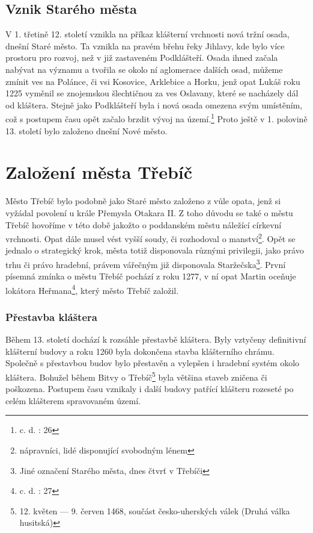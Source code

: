 \documentclass[a4paper,oneside,12p]{report}
\begin{document}
\subsection{Vznik Starého města}
V 1. třetině 12. století vznikla na příkaz klášterní vrchnosti nová tržní osada, dnešní Staré město.
Ta vznikla na pravém břehu řeky Jihlavy, kde bylo více prostoru pro rozvoj, než v již zastaveném Podklášteří.
Osada ihned začala nabývat na významu a tvořila se okolo ní aglomerace dalších osad, můžeme zmínit ves na Polánce, či vsi Kosovice, Arklebice a Horku, jenž opat Lukáš roku 1225 vyměnil se znojemskou šlechtičnou za ves Oslavany, které se nacházely dál od kláštera.
Stejně jako Podklášteří byla i nová osada omezena svým umístěním, což s postupem času opět začalo brzdit vývoj na území.\footnote{c. d. : 26}
Proto ještě v 1. polovině 13. století bylo založeno dnešní Nové město.


\section{Založení města Třebíč}
Město Třebíč bylo podobně jako Staré město založeno z vůle opata, jenž si vyžádal povolení u krále Přemysla Otakara II.
Z toho důvodu se také o městu Třebíč hovoříme v této době jakožto o poddanském městu náležící církevní vrchnosti.
Opat dále musel vést vyšší soudy, či rozhodoval o manství\footnote{nápravníci, lidé disponující svobodným lénem}.
Opět se jednalo o strategický krok, města totiž disponovala různými privilegii, jako právo trhu či právo hradební, právem vářečným již disponovala Staržečska\footnote{Jiné označení Starého města, dnes čtvrť v Třebíči}.
První písemná zmínka o městu Třebíč pochází z roku 1277, v ní opat Martin oceňuje lokátora Heřmana\footnote{c. d. : 27}, který město Třebíč založil.

\subsubsection{Přestavba kláštera}

Během 13. století dochází k rozsáhle přestavbě kláštera.
Byly vztyčeny definitivní klášterní budovy a roku 1260 byla dokončena stavba klášterního chrámu.
Společně s přestavbou budov bylo přestavěn a vylepšen i hradební systém okolo kláštera.
Bohužel během Bitvy o Třebíč\footnote{12. květen — 9. červen 1468, součást česko-uherských válek (Druhá válka husitská)} byla většina staveb zničena či poškozena.
Postupem času vznikaly i další budovy patřící klášteru rozeseté po celém klášterem spravovaném území.
\end{document}
